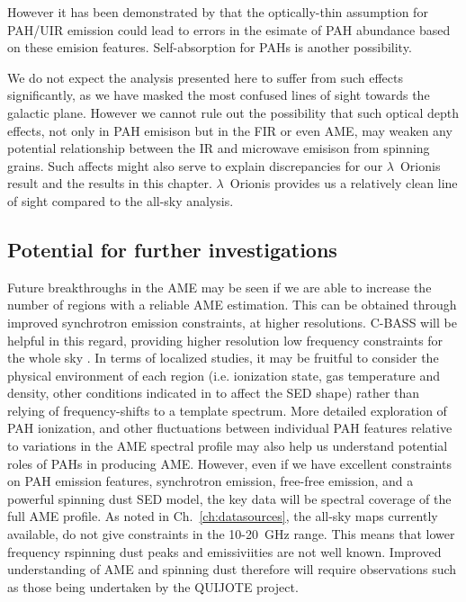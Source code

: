               However it has been demonstrated by \cite{sakon04} that the optically-thin assumption for PAH/UIR emission could lead to errors in the esimate of PAH abundance based on these emision features. Self-absorption for PAHs is another possibility.

              We do not expect the analysis presented here to suffer from such effects significantly, as we have masked the most confused lines of sight towards the galactic plane. However we cannot rule out the possibility that such optical depth effects, not only in PAH emisison but in the FIR or even AME, may weaken any potential relationship between the IR and microwave emisison from spinning grains. Such affects might also serve to explain discrepancies for our $\lambda$~Orionis result and the results in this chapter. $\lambda$~Orionis provides us a relatively clean line of sight compared to the all-sky analysis.

            \subsection{Potential for further investigations}
                Future breakthroughs in the AME may be seen if we are able to increase the number of regions with a reliable AME estimation. This can be obtained through improved synchrotron emission constraints, at higher resolutions. C-BASS will be helpful in this regard, providing higher resolution low frequency constraints for the whole sky \citep{irfan15}. In terms of localized studies, it may be fruitful to consider the physical environment of each region (i.e. ionization state, gas temperature and density, other conditions indicated in \cite{draine98a, ali-haimoud10} to affect the SED shape) rather than relying of frequency-shifts to a template spectrum. More detailed exploration of PAH ionization, and other fluctuations between individual PAH features relative to variations in the AME spectral profile may also help us understand potential roles of PAHs in producing AME. However, even if we have excellent constraints on PAH emission features, synchrotron emission, free-free emission, and a powerful spinning dust SED model, the key data will be spectral coverage of the full AME profile. As noted in Ch.~\ref{ch:datasources}, the all-sky maps currently available, do not give constraints in the 10-20~GHz range. This means that lower frequency rspinning dust peaks and emissiviities are not well known. Improved understanding of AME and spinning dust therefore will require observations such as those being undertaken by the QUIJOTE \citep{santos15} project.

